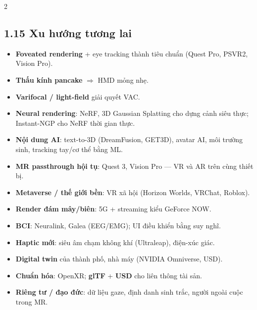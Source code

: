 \begin{paracol}{2}
\subsection*{1.15 Xu hướng tương lai}
\begin{itemize}[leftmargin=*,nosep]
  \item \textbf{Foveated rendering} + eye tracking thành tiêu chuẩn (Quest Pro, PSVR2, Vision Pro).
  \item \textbf{Thấu kính pancake} $\Rightarrow$ HMD mỏng nhẹ.
  \item \textbf{Varifocal / light-field} giải quyết VAC.
  \item \textbf{Neural rendering}: NeRF, 3D Gaussian Splatting cho dựng cảnh siêu thực; Instant-NGP cho NeRF thời gian thực.
  \item \textbf{Nội dung AI}: text-to-3D (DreamFusion, GET3D), avatar AI, môi trường sinh, tracking tay/cơ thể bằng ML.
  \item \textbf{MR passthrough hội tụ}: Quest 3, Vision Pro — VR và AR trên cùng thiết bị.
  \item \textbf{Metaverse / thế giới bền}: VR xã hội (Horizon Worlds, VRChat, Roblox).
  \item \textbf{Render đám mây/biên}: 5G + streaming kiểu GeForce NOW.
  \item \textbf{BCI}: Neuralink, Galea (EEG/EMG); UI điều khiển bằng suy nghĩ.
  \item \textbf{Haptic mới}: siêu âm chạm không khí (Ultraleap), điện-xúc giác.
  \item \textbf{Digital twin} của thành phố, nhà máy (NVIDIA Omniverse, USD).
  \item \textbf{Chuẩn hóa}: OpenXR; \textbf{glTF} + \textbf{USD} cho liên thông tài sản.
  \item \textbf{Riêng tư / đạo đức}: dữ liệu gaze, định danh sinh trắc, người ngoài cuộc trong MR.
\end{itemize}

\switchcolumn*


\end{paracol}
